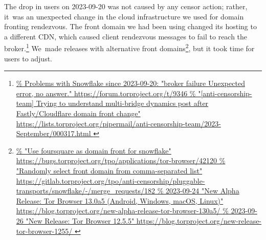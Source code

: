 \documentclass[letterpaper,twocolumn]{article}
\newlength{\urlfootnotesize}
\newcommand{\urlfootnote}[1]{\footnote{
\raggedright\hangindent\footnotemargin%
\fontsize{\urlfootnotesize}{\urlfootnotesize}\selectfont%
\url{#1}
}}
\begin{document}
The drop in users on \mbox{2023-09-20}
was not caused by any censor action;
rather, it~was an unexpected change in the cloud
infrastructure we used for domain fronting rendezvous.
The front domain we had been using
changed its hosting to a different CDN,
which caused client rendezvous messages to fail to reach the broker.\urlfootnote{
https://forum.torproject.org/t/9346
}
We~made releases
with alternative front domains\urlfootnote{
https://bugs.torproject.org/tpo/applications/tor-browser/42120
},
but it took time for users to adjust.
\end{document}
